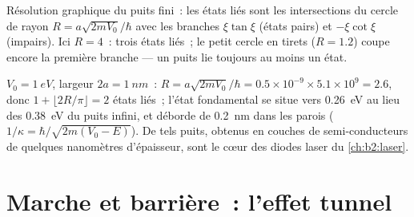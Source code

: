 \begin{omfigure}

{\small Résolution graphique du puits fini~: les états liés sont
les intersections du cercle de rayon $R = a\sqrt{2mV_0}/\hbar$ avec
les branches $\xi\tan\xi$ (états pairs) et $-\xi\cot\xi$ (impairs). Ici
$R = 4$~: trois états liés~; le petit cercle en tirets ($R = 1.2$) coupe encore
la première branche --- un puits lie toujours au moins un état.}
\end{omfigure}

\begin{example}\label{ex:b2:potential-wells-tunneling:finite}
$V_0 = \qty{1}{eV}$, largeur $2a = \qty{1}{nm}$~: $R = a\sqrt{2mV_0}/\hbar = 0.5 \times
10^{-9} \times 5.1 \times 10^9 = 2.6$, donc $1 + \lfloor 2R/\pi\rfloor = 2$ états
liés~; l'état fondamental se situe vers \qty{0.26}{eV} au lieu des \qty{0.38}{eV}
du puits infini, et déborde de \qty{0.2}{nm} dans les parois
($1/\kappa = \hbar/\sqrt{2m(V_0 - E)}$). De tels puits, obtenus en couches de
semi-conducteurs de quelques nanomètres d'épaisseur, sont le cœur des diodes
laser du \cref{ch:b2:laser}.
\end{example}

\section{Marche et barrière~: l'effet tunnel}

